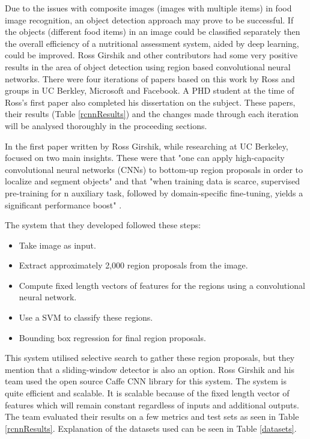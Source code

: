 Due to the issues with composite images (images with multiple items) in food image recognition, an object detection approach may prove to be successful.
If the objects (different food items) in an image could be classified separately then the overall efficiency of a nutritional assessment system, aided by deep learning, could be improved.
Ross Girshik and other contributors had some very positive results in the area
of object detection using region based convolutional neural networks. There were
four iterations of papers based on this work by Ross and groups in UC Berkley,
Microsoft and Facebook. A PHD student at the time of Ross's first paper also
completed his dissertation on the subject. These papers, their
results (Table \ref{rcnnResults}) and the changes made through each iteration will be analysed thoroughly in the proceeding sections.

In the first paper written by Ross Girshik, while researching at UC Berkeley,
focused on two main insights. These were that "one can apply high-capacity convolutional neural networks (CNNs) to bottom-up region proposals in order to localize and segment objects" and that
"when training data is scarce, supervised pre-training for n auxiliary task,
followed by domain-specific fine-tuning, yields a significant performance boost"
\parencite{rcnn}.

The system that they developed followed these steps:
\begin{itemize}
    \item{Take image as input.}
    \item{Extract approximately 2,000 region proposals from the image.}
    \item{Compute fixed length vectors of features for the regions using a convolutional
        neural network.}
    \item{Use a SVM to classify these regions.}
    \item{Bounding box regression for final region proposals.}
\end{itemize}

This system utilised selective search to gather these region proposals, but they
mention that a sliding-window detector is also an option. Ross Girshik and his
team used the open source Caffe CNN library for this system. The system is quite
efficient and scalable. It is scalable because of the fixed length vector of
features which will remain constant regardless of inputs and additional outputs.
The team evaluated their results on a few metrics and test sets as seen in Table
\ref{rcnnResults}. Explanation of the datasets used can be seen in Table \ref{datasets}.

